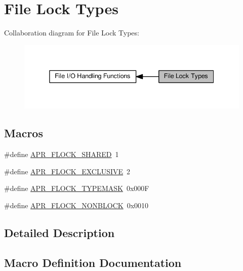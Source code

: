 \hypertarget{group__apr__file__lock__types}{}\section{File Lock Types}
\label{group__apr__file__lock__types}
Collaboration diagram for File Lock Types\+:
\nopagebreak
\begin{figure}[H]
\begin{center}
\leavevmode
\includegraphics[width=338pt]{group__apr__file__lock__types}
\end{center}
\end{figure}
\subsection*{Macros}
\begin{DoxyCompactItemize}
\item 
\#define \hyperlink{group__apr__file__lock__types_gaba177fe81cd70b389753ad2096b2ce7c}{A\+P\+R\+\_\+\+F\+L\+O\+C\+K\+\_\+\+S\+H\+A\+R\+ED}~1
\item 
\#define \hyperlink{group__apr__file__lock__types_gafbf0caa093b99bdf11e25360b9099852}{A\+P\+R\+\_\+\+F\+L\+O\+C\+K\+\_\+\+E\+X\+C\+L\+U\+S\+I\+VE}~2
\item 
\#define \hyperlink{group__apr__file__lock__types_ga40777e364fb20bb9a9ee57e74b19c13d}{A\+P\+R\+\_\+\+F\+L\+O\+C\+K\+\_\+\+T\+Y\+P\+E\+M\+A\+SK}~0x000F
\item 
\#define \hyperlink{group__apr__file__lock__types_gab327fa0250e19006f20d5ec65fe7f22a}{A\+P\+R\+\_\+\+F\+L\+O\+C\+K\+\_\+\+N\+O\+N\+B\+L\+O\+CK}~0x0010
\end{DoxyCompactItemize}


\subsection{Detailed Description}


\subsection{Macro Definition Documentation}
